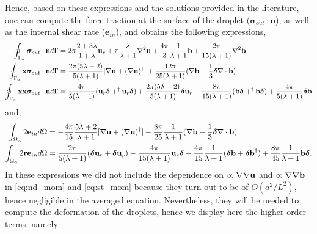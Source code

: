 Hence, based on these expressions and the solutions  provided in the literature, one can compute the force traction at the surface of the droplet ($\bm\sigma_{out}\cdot \textbf{n}$), as well as the internal shear rate ($\textbf{e}_{in}$), and obtains the following expressions, 
\begin{align}
    \intS{\bm\sigma_{out}\cdot \textbf{n}} &
    =
    2\pi\frac{2+3\lambda}{1+\lambda}\textbf{u}_r
    + \pi \frac{\lambda}{\lambda +1} \grad^2 \textbf{u}
    +
    \frac{4\pi}{3}\frac{1}{\lambda +1}\textbf{b}
    + \frac{2\pi}{15(\lambda +1)}\grad^2\textbf{b}
    \\
    \intS{ \textbf{x}\bm\sigma_{out}\cdot \textbf{n}} &
    =
    \frac{2\pi(5\lambda +2)}{5(\lambda +1)}[\grad \textbf{u}+ (\grad \textbf{u})^\dagger]
    + \frac{12\pi}{25(\lambda +1)} (\grad \textbf{b} -\frac{1}{3}\bm\delta\div \textbf{b}) 
    \\
    \intS{\textbf{xx}\bm\sigma_{out}\cdot \textbf{n}} &
    =
    \frac{4\pi}{5(\lambda +1)} (\textbf{u}_r \bm\delta + ^\dagger\textbf{u}_r \bm\delta)
    + \frac{2\pi(5\lambda +2)}{5(\lambda+1)}\bm\delta \textbf{u}_r
    - \frac{8\pi}{15(\lambda +1)} ( \textbf{b}\bm\delta + ^\dagger\textbf{b}\bm\delta )
    + \frac{4\pi}{5(\lambda+1)}\bm\delta \textbf{b}
    \label{eq:nd_mom}
\end{align}
and, 
\begin{align}
    \intO{2\textbf{e}_{in}}
    &=
    -\frac{4\pi}{15}\frac{5\lambda +2}{\lambda+1}
    [\grad \textbf{u}+ (\grad \textbf{u})^\dagger]
    - \frac{8\pi}{25}\frac{1}{\lambda+1}
    (\grad \textbf{b} -\frac{1}{3}\bm\delta\div \textbf{b})
    \\
    \intO{2\textbf{r}\textbf{e}_{in}}
    &=
    \frac{2\pi}{5(\lambda+1)}
    (\bm\delta \textbf{u}_r +  \bm\delta\textbf{u}_r^\dagger)
    -\frac{4\pi}{15(\lambda+1)}\textbf{u}_r\bm\delta 
    -\frac{4\pi}{15}\frac{1}{\lambda+1}
    (\bm\delta \textbf{b} +  \bm\delta\textbf{b}^\dagger)
    +\frac{8\pi}{45}\frac{1}{\lambda+1}
    \textbf{b}\bm\delta. 
    \label{eq:st_mom}
\end{align}
In these expressions we did not include the dependence on $\propto \mathbf{\nabla}\mathbf{\nabla} \textbf{u}$ and $\propto \mathbf{\nabla}\mathbf{\nabla} \textbf{b}$ in \ref{eq:nd_mom} and \ref{eq:st_mom} because they turn out to be of $O(a^2/L^2)$, hence negligible in the averaged equation. 
Nevertheless, they will be needed to compute the deformation of the droplets, hence we display here the higher order terms, namely 
